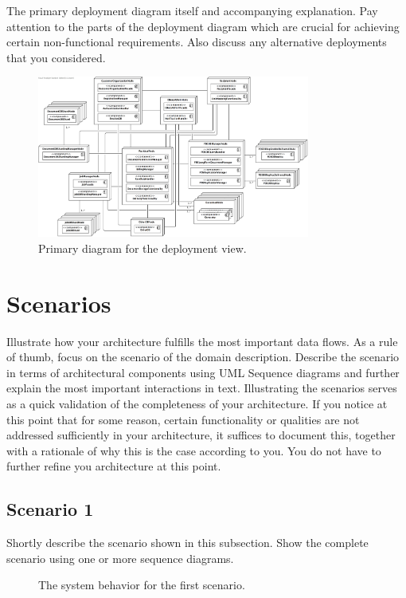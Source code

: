 \documentclass[a4paper,10pt]{article}
\begin{document}
The primary deployment diagram itself and accompanying explanation.
Pay attention to the parts of the deployment diagram which are crucial for
achieving certain non-functional requirements.
Also discuss any alternative deployments that you considered.

\begin{figure}[!htp]
    \centering
	\includegraphics[width=0.8\textwidth]{TotalDeployment.png}
    \caption{Primary diagram for the deployment view.}
    \label{fig:depl_primary}
\end{figure}
\FloatBarrier

\section{Scenarios}\label{sec:scenarios}
Illustrate how your architecture fulfills the most important data flows.
As a rule of thumb, focus on the scenario of the domain description.
Describe the scenario in terms of architectural components using UML Sequence
diagrams and further explain the most important interactions in text.
Illustrating the scenarios serves as a quick validation of the completeness of
your architecture.
If you notice at this point that for some reason, certain functionality or
qualities are not addressed sufficiently in your architecture, it suffices to
document this, together with a rationale of why this is the case according to
you.
You do not have to further refine you architecture at this point.

\subsection{Scenario 1}
Shortly describe the scenario shown in this subsection.
Show the complete scenario using one or more sequence diagrams.

\begin{figure}[!htp]
    \centering
    \caption{The system behavior for the first scenario.
        }\label{fig:seq_scenario1}
\end{figure}
\end{document}
